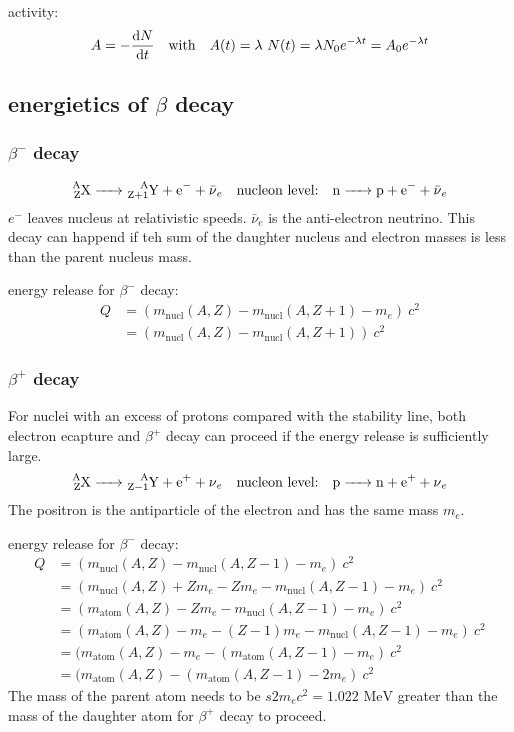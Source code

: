 \documentclass[10pt, a4paper, twocolumn]{article}
\begin{document}
activity:
\[ A=-\dv{N}{t} \qq{with}
A(t)=\lambda\ N(t)=\lambda N_0e^{-\lambda t}
=A_0e^{-\lambda t}\]

\subsection{energietics of $\beta$ decay}

\subsubsection{$\beta ^-$ decay}
\[ \ce{_Z^AX -> _{Z+1}^AY +e^- +\bar{\nu}_e}
\qq{nucleon level:} \ce{n -> p +e^- +\bar{\nu}_e} \]
$e^-$ leaves nucleus at relativistic speeds. $\bar{\nu}_e$ is the anti-electron neutrino. This decay can happend if teh sum of the daughter nucleus and electron masses is less than the parent nucleus mass.

energy release for $\beta ^-$ decay:
\begin{equation*}
\begin{aligned}
Q&=(m_\text{nucl}(A,Z)
-m_\text{nucl}(A,Z+1) - m_e)\ c^2
\\&=(m_\text{nucl}(A,Z)
-m_\text{nucl}(A,Z+1))\ c^2
\end{aligned}
\end{equation*}
\subsubsection{$\beta ^+$ decay}

For nuclei with an excess of protons compared with the stability line, both electron ecapture and $\beta ^+$ decay can proceed if the energy release is sufficiently large.
\[ \ce{_Z^AX -> _{Z-1}^AY +e^+ +\nu_e}
\qq{nucleon level:} \ce{p -> n +e^+ +\nu_e} \]
The positron is the antiparticle of the electron and has the same mass $m_e$.

energy release for $\beta ^-$ decay:
\begin{equation*}
\begin{aligned}
Q&=(m_\text{nucl}(A,Z)
-m_\text{nucl}(A,Z-1) - m_e)\ c^2
\\&=(m_\text{nucl}(A,Z)
+Zm_e-Zm_e
-m_\text{nucl}(A,Z-1) - m_e)\ c^2
\\&=(m_\text{atom} (A,Z)-Zm_e
-m_\text{nucl}(A,Z-1)-m_e)\ c^2
\\&=(m_\text{atom} (A,Z)-m_e
-(Z-1)m_e - m_\text{nucl}(A,Z-1)-m_e)\ c^2
\\&=(m_\text{atom} (A,Z)-m_e
-(m_\text{atom} (A,Z-1)-m_e)\ c^2
\\&=(m_\text{atom} (A,Z)
-(m_\text{atom} (A,Z-1)-2m_e)\ c^2
\end{aligned}
\end{equation*}
The mass of the parent atom needs to be $s2m_ec^2=1.022\text{ MeV}$ greater than the mass of the daughter atom for $\beta ^+$ decay to proceed.
\end{document}
